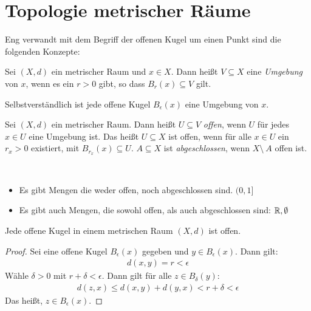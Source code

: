 \section{Topologie metrischer Räume}
Eng verwandt mit dem Begriff der offenen Kugel um einen Punkt sind die folgenden 
Konzepte:

\begin{Definition}{%
	Sei $(X,d)$ ein metrischer Raum und $x \in X$. Dann heißt $V \subseteq X$ eine 
	\emph{Umgebung} von $x$, wenn es ein $r > 0$ gibt, so dass $B_r(x) \subseteq V$ 
	gilt.
}\end{Definition}

\begin{Beispiel}
	Selbstverständlich ist jede offene Kugel $B_\epsilon(x)$ eine Umgebung von $x$.
\end{Beispiel}

\begin{Definition}{%
	Sei $(X,d)$ ein metrischer Raum. Dann heißt $U \subseteq V$ \emph{offen}, wenn 
	$U$ für jedes $x \in U$ eine Umgebung ist.
	Das heißt $U \subseteq X$ ist offen, wenn für alle $x \in U$ ein $r_x > 0$ 
	existiert, mit $B_{r_x}(x) \subseteq U$. 
	$A \subseteq X$ ist \emph{abgeschlossen}, wenn $X \setminus\ A$ offen ist. 
}\end{Definition}

\begin{Bemerkung}~
	\begin{itemize}
		\item Es gibt Mengen die weder offen, noch abgeschlossen sind. $(0,1]$
		\item Es gibt auch Mengen, die sowohl offen, als auch abgeschlossen sind:
		$\mathbb{R}, \emptyset$
	\end{itemize}
\end{Bemerkung}

\begin{Lemma}{%
	Jede offene Kugel in einem metrischen Raum $(X,d)$ ist offen.
}\end{Lemma}

\begin{proof}
	Sei eine offene Kugel $B_\epsilon(x)$ gegeben und $y \in B_\epsilon(x)$. 
	Dann gilt:
	\begin{align*}
		d(x,y) = r < \epsilon
	\end{align*}
	Wähle $\delta > 0$ mit $r + \delta < \epsilon$. Dann gilt für alle 
	$z \in B_\delta (y)$:
	\begin{align*}
		d(z,x) \leq d(x,y) + d(y,x) < r + \delta < \epsilon
	\end{align*}
	Das heißt, $z \in B_\epsilon(x)$.
\end{proof}
